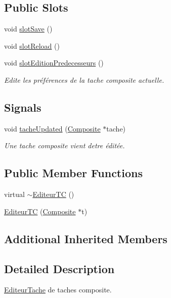 \subsection*{Public Slots}
\begin{DoxyCompactItemize}
\item 
void \hyperlink{class_editeur_t_c_a78904fa61e51fbd485aa792237285f99}{slot\+Save} ()
\item 
void \hyperlink{class_editeur_t_c_ad11356d9824f4cab16274988b2881c22}{slot\+Reload} ()
\item 
void \hyperlink{class_editeur_t_c_ab364f1db3119693a9af4785af0e156d6}{slot\+Edition\+Predecesseurs} ()
\begin{DoxyCompactList}\small\item\em Edite les préférences de la tache composite actuelle. \end{DoxyCompactList}\end{DoxyCompactItemize}
\subsection*{Signals}
\begin{DoxyCompactItemize}
\item 
void \hyperlink{class_editeur_t_c_a6bf8df2c0f505ce09faf9152a3fd1483}{tache\+Updated} (\hyperlink{class_composite}{Composite} $\ast$tache)
\begin{DoxyCompactList}\small\item\em Une tache composite vient d\textquotesingle{}etre éditée. \end{DoxyCompactList}\end{DoxyCompactItemize}
\subsection*{Public Member Functions}
\begin{DoxyCompactItemize}
\item 
virtual \hyperlink{class_editeur_t_c_a6cd28fad391d71dbdecec70ccc1cdf4f}{$\sim$\+Editeur\+T\+C} ()
\item 
\hyperlink{class_editeur_t_c_ac63bdb73f54321eda4d4cfea03f88df1}{Editeur\+T\+C} (\hyperlink{class_composite}{Composite} $\ast$t)
\end{DoxyCompactItemize}
\subsection*{Additional Inherited Members}


\subsection{Detailed Description}
\hyperlink{class_editeur_tache}{Editeur\+Tache} de taches composite. 


